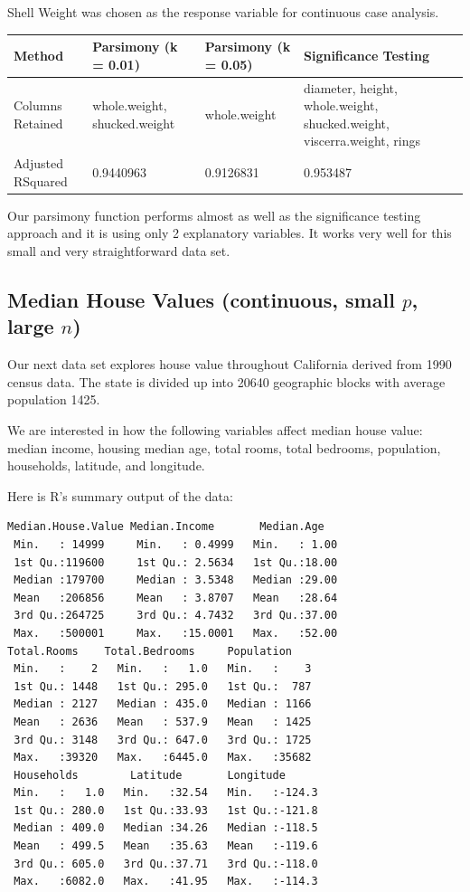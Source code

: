 \documentclass[letter]{article}
\begin{document}
Shell Weight was chosen as the response variable for continuous case analysis.

\begin{center}
    \begin{tabular}{ | l |  p{4cm} |  p{4cm} | p{4cm} |}
    \hline
    Method & Parsimony (k = 0.01) & Parsimony (k = 0.05) & Significance Testing \\ \hline
    	
    Columns Retained & whole.weight, shucked.weight & whole.weight & diameter, height, whole.weight, shucked.weight, viscerra.weight, rings\\ \hline
    
    Adjusted RSquared & 0.9440963 & 0.9126831 & 0.953487\\ \hline
    
    \end{tabular}
\end{center}

Our parsimony function performs almost as well as the significance testing approach and it is using only 2 explanatory variables. It works very well for this small and very straightforward data set.

\subsection*{Median House Values \cite{cadata} (continuous, small $p$, large $n$)}
Our next data set explores house value throughout California derived from 1990 census data. The state is divided up into 20640 geographic blocks with average population 1425.

We are interested in how the following variables affect median house value: median income, housing median age, total rooms, total bedrooms, population, households, latitude, and longitude.

Here is R's summary output of the data:
\begin{verbatim}
Median.House.Value Median.Income       Median.Age   
 Min.   : 14999     Min.   : 0.4999   Min.   : 1.00  
 1st Qu.:119600     1st Qu.: 2.5634   1st Qu.:18.00  
 Median :179700     Median : 3.5348   Median :29.00  
 Mean   :206856     Mean   : 3.8707   Mean   :28.64  
 3rd Qu.:264725     3rd Qu.: 4.7432   3rd Qu.:37.00  
 Max.   :500001     Max.   :15.0001   Max.   :52.00
Total.Rooms    Total.Bedrooms     Population   
 Min.   :    2   Min.   :   1.0   Min.   :    3  
 1st Qu.: 1448   1st Qu.: 295.0   1st Qu.:  787  
 Median : 2127   Median : 435.0   Median : 1166  
 Mean   : 2636   Mean   : 537.9   Mean   : 1425  
 3rd Qu.: 3148   3rd Qu.: 647.0   3rd Qu.: 1725  
 Max.   :39320   Max.   :6445.0   Max.   :35682
 Households        Latitude       Longitude     
 Min.   :   1.0   Min.   :32.54   Min.   :-124.3  
 1st Qu.: 280.0   1st Qu.:33.93   1st Qu.:-121.8  
 Median : 409.0   Median :34.26   Median :-118.5  
 Mean   : 499.5   Mean   :35.63   Mean   :-119.6  
 3rd Qu.: 605.0   3rd Qu.:37.71   3rd Qu.:-118.0  
 Max.   :6082.0   Max.   :41.95   Max.   :-114.3  
 \end{verbatim}
\end{document}
